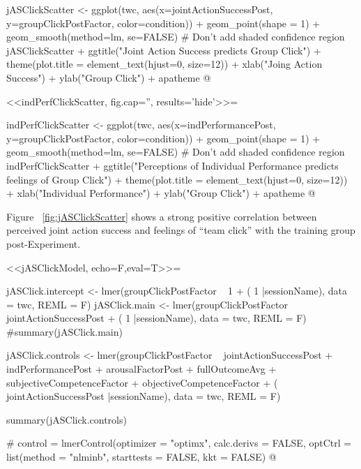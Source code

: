 jASClickScatter <- ggplot(twc, aes(x=jointActionSuccessPost, y=groupClickPostFactor,
                            color=condition)) + geom_point(shape = 1) +
                            geom_smooth(method=lm, se=FALSE)   # Don't add shaded confidence region
jASClickScatter +
            ggtitle("Joint Action Success predicts Group Click") +
            theme(plot.title = element_text(hjust=0, size=12)) +
            xlab("Joing Action Success") +
            ylab("Group Click") +
            apatheme
@

<<indPerfClickScatter, fig.cap='', results='hide'>>=

indPerfClickScatter <- ggplot(twc, aes(x=indPerformancePost, y=groupClickPostFactor,
                            color=condition)) + geom_point(shape = 1) +
                            geom_smooth(method=lm, se=FALSE)   # Don't add shaded confidence region
indPerfClickScatter +
            ggtitle("Perceptions of Individual Performance predicts feelings of Group Click") +
            theme(plot.title = element_text(hjust=0, size=12)) +
            xlab("Individual Performance") +
            ylab("Group Click") +
            apatheme
@


Figure ~\ref{fig:jASClickScatter} shows a strong positive correlation between perceived joint action success and feelings of ``team click'' with the training group post-Experiment.



<<jASClickModel, echo=F,eval=T>>=

jASClick.intercept <- lmer(groupClickPostFactor ~ 1 + ( 1 |sessionName),
                            data = twc,
                            REML = F)
jASClick.main <- lmer(groupClickPostFactor ~ jointActionSuccessPost + ( 1 |sessionName),
                            data = twc,
                            REML = F)
#summary(jASClick.main)

jASClick.controls <- lmer(groupClickPostFactor ~ jointActionSuccessPost +
                            indPerformancePost + arousalFactorPost + fullOutcomeAvg +
                            subjectiveCompetenceFactor + objectiveCompetenceFactor +
                            ( jointActionSuccessPost |sessionName),
                            data = twc,
                            REML = F)

summary(jASClick.controls)

# control = lmerControl(optimizer = "optimx", calc.derivs = FALSE, optCtrl = list(method = "nlminb", starttests = FALSE, kkt = FALSE)
@

